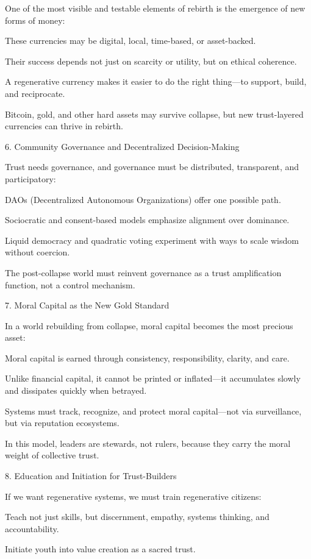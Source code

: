 \documentclass[11pt,oneside]{book}
\begin{document}
One of the most visible and testable elements of rebirth is the emergence of new forms of money:

    These currencies may be digital, local, time-based, or asset-backed.

    Their success depends not just on scarcity or utility, but on ethical coherence.

    A regenerative currency makes it easier to do the right thing—to support, build, and reciprocate.

Bitcoin, gold, and other hard assets may survive collapse, but new trust-layered currencies can thrive in rebirth.

6. Community Governance and Decentralized Decision-Making


Trust needs governance, and governance must be distributed, transparent, and participatory:

    DAOs (Decentralized Autonomous Organizations) offer one possible path.

    Sociocratic and consent-based models emphasize alignment over dominance.

    Liquid democracy and quadratic voting experiment with ways to scale wisdom without coercion.

The post-collapse world must reinvent governance as a trust amplification function, not a control mechanism.

7. Moral Capital as the New Gold Standard


In a world rebuilding from collapse, moral capital becomes the most precious asset:

    Moral capital is earned through consistency, responsibility, clarity, and care.

    Unlike financial capital, it cannot be printed or inflated—it accumulates slowly and dissipates quickly when betrayed.

    Systems must track, recognize, and protect moral capital—not via surveillance, but via reputation ecosystems.

In this model, leaders are stewards, not rulers, because they carry the moral weight of collective trust.

8. Education and Initiation for Trust-Builders


If we want regenerative systems, we must train regenerative citizens:

    Teach not just skills, but discernment, empathy, systems thinking, and accountability.

    Initiate youth into value creation as a sacred trust.
\end{document}
